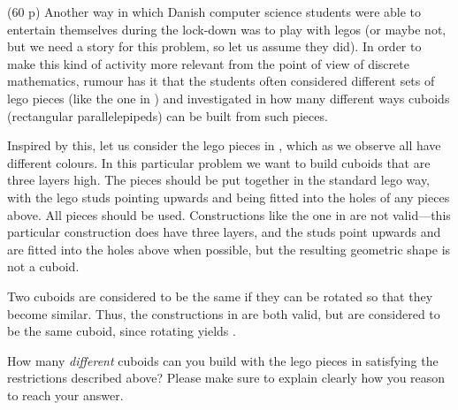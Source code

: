 \documentclass{jn-pset}
\begin{document}
\begin{problem}%
  \label{problem:lego}%
  (60 p)
%     
%   
  Another way in which Danish computer science students were able to entertain 
  themselves during the lock-down was to play with legos
  (or maybe not, but we need a story for this problem, so let us assume they did).
%   
  In order to make this 
  kind of 
  activity more relevant from the point
  of view of  discrete mathematics,
  rumour has it that the students often considered different sets of lego
  pieces (like the one in    )
  and investigated 
  in how many different ways cuboids
  (rectangular parallelepipeds)
  can be built
  from such pieces.

%   


  Inspired by this, let us consider
  the lego pieces in 
  ,
  which as we observe  all have different colours.
%
  In this particular problem we want to build cuboids that are three
  layers high.
  The pieces should be put together in the standard lego way, with
  the lego studs pointing upwards and being fitted into the holes
  of any pieces above. 
  All pieces should be used.
  Constructions like the one in 
  are not valid---this particular construction does have three layers,
  and the studs point upwards and are fitted into the holes above when
  possible, but the   resulting  geometric shape is not a  cuboid.

  Two cuboids are considered to be the same if they can be rotated so
  that they become similar. Thus, the constructions in 
   are both valid, but are
  considered to be the same cuboid, since rotating
  yields
  .

  How many \emph{different} cuboids can you build with the lego pieces in
  satisfying the restrictions described above?
  Please make sure to explain clearly how you reason to reach your answer.


\end{problem}
\end{document}
